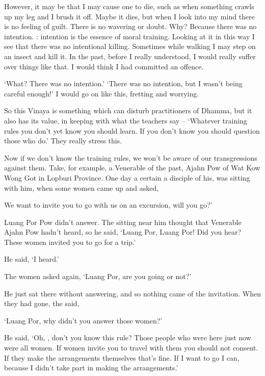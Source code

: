 However, it may be that I may cause one to die, such as when something crawls up my leg and I brush it off. Maybe it dies, but when I look into my mind there is no feeling of guilt. There is no wavering or doubt. Why? Because there was no intention. : intention is the essence of moral training. Looking at it in this way I see that there was no intentional killing. Sometimes while walking I may step on an insect and kill it. In the past, before I really understood, I would really suffer over things like that. I would think I had committed an offence.

`What? There was no intention.' `There was no intention, but I wasn't being careful enough!' I would go on like this, fretting and worrying.

So this Vinaya is something which can disturb practitioners of Dhamma, but it also has its value, in keeping with what the teachers say -- `Whatever training rules you don't yet know you should learn. If you don't know you should question those who do.' They really stress this.

Now if we don't know the training rules, we won't be aware of our transgressions against them. Take, for example, a Venerable  of the past, Ajahn Pow of Wat Kow Wong Got in Lopburi Province. One day a certain  a disciple of his, was sitting with him, when some women came up and asked,

 We want to invite you to go with us on an excursion, will you go?'

Luang Por Pow didn't answer. The  sitting near him thought that Venerable Ajahn Pow hadn't heard, so he said, `Luang Por, Luang Por! Did you hear? These women invited you to go for a trip.'

He said, `I heard.'

The women asked again, `Luang Por, are you going or not?'

He just sat there without answering, and so nothing came of the invitation. When they had gone, the  said,

`Luang Por, why didn't you answer those women?'

He said, `Oh, , don't you know this rule? Those people who were here just now were all women. If women invite you to travel with them you should not consent. If they make the arrangements themselves that's fine. If I want to go I can, because I didn't take part in making the arrangements.'

